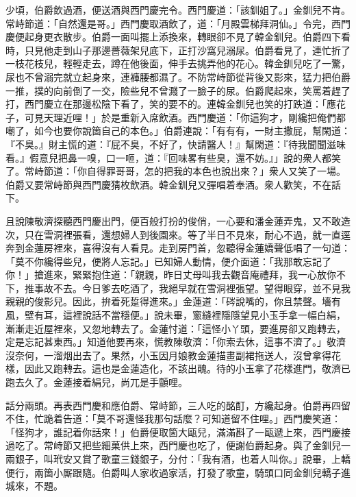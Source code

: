 少頃，伯爵飲過酒，便送酒與西門慶完令。西門慶道：「該釧姐了。」金釧兒不肯。常峙節道：「自然還是哥。」西門慶取酒飲了，道：「月殿雲梯拜洞仙。」令完，西門慶便起身更衣散步。伯爵一面叫擺上添換來，轉眼卻不見了韓金釧兒。伯爵四下看時，只見他走到山子那邊薔薇架兒底下，正打沙窩兒溺尿。伯爵看見了，連忙折了一枝花枝兒，輕輕走去，蹲在他後面，伸手去挑弄他的花心。韓金釧兒吃了一驚，尿也不曾溺完就立起身來，連褲腰都濕了。{}不防常峙節從背後又影來，猛力把伯爵一推，撲的向前倒了一交，險些兒不曾濺了一臉子的尿。{}伯爵爬起來，笑罵着趕了打，西門慶立在那邊松陰下看了，笑的要不的。連韓金釧兒也笑的打跌道：「應花子，可見天理近哩！」於是重新入席飲酒。西門慶道：「你這狗才，剛纔把俺們都嘲了，如今也要你說箇自己的本色。」伯爵連說：「有有有，一財主撒屁，幫閑道：『不臭。』財主慌的道：『屁不臭，不好了，快請醫人！』幫閑道：『待我聞聞滋味看。』假意兒把鼻一嗅，口一咂，{}道：『回味畧有些臭，還不妨。』」說的衆人都笑了。常峙節道：「你自得罪哥哥，怎的把我的本色也說出來？」衆人又笑了一場。伯爵又要常峙節與西門慶猜枚飲酒。韓金釧兒又彈唱着奉酒。衆人歡笑，不在話下。

且說陳敬濟探聽西門慶出門，便百般打扮的俊俏，一心要和潘金蓮弄鬼，又不敢造次，只在雪洞裡張看，還想婦人到後園來。等了半日不見來，耐心不過，就一直逕奔到金蓮房裡來，喜得沒有人看見。走到房門首，忽聽得金蓮嬌聲低唱了一句道：「莫不你纔得些兒，便將人忘記。」{}已知婦人動情，便介面道：「我那敢忘記了你！」搶進來，緊緊抱住道：「親親，昨日丈母叫我去觀音庵禮拜，我一心放你不下，推事故不去。今日爹去吃酒了，我絕早就在雪洞裡張望。望得眼穿，並不見我親親的俊影兒。{}因此，拚着死踅得進來。」金蓮道：「硶說嘴的，你且禁聲。墻有風，壁有耳，這裡說話不當穩便。」說未畢，窻縫裡隱隱望見小玉手拿一幅白絹，漸漸走近屋裡來，又忽地轉去了。金蓮忖道：「這怪小丫頭，要進房卻又跑轉去，定是忘記甚東西。」知道他要再來，慌教陳敬濟：「你索去休，這事不濟了。」敬濟沒奈何，一溜烟出去了。{}果然，小玉因月娘教金蓮描畫副裙拖送人，沒曾拿得花樣，因此又跑轉去。這也是金蓮造化，不該出醜。待的小玉拿了花樣進門，敬濟已跑去久了。金蓮接着絹兒，尚兀是手顫哩。

話分兩頭。再表西門慶和應伯爵、常峙節，三人吃的酩酊，方纔起身。伯爵再四留不住，忙跪着告道：「莫不哥還怪我那句話麼？可知道留不住哩。」西門慶笑道：「怪狗才，誰記着你話來！」伯爵便取箇大甌兒，滿滿斟了一甌遞上來，西門慶接過吃了。常峙節又把些細菓供上來，西門慶也吃了，便謝伯爵起身。與了金釧兒一兩銀子，叫玳安又賞了歌童三錢銀子，分付：「我有酒，也着人叫你。」說畢，上轎便行，兩箇小厮跟隨。伯爵叫人家收過家活，打發了歌童，騎頭口同金釧兒轎子進城來，不題。

